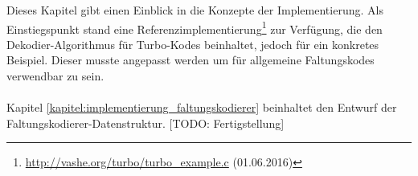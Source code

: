 Dieses Kapitel gibt einen Einblick in die Konzepte der Implementierung. Als Einstiegspunkt stand eine Referenzimplementierung\footnote{\url{http://vashe.org/turbo/turbo_example.c} (01.06.2016)} zur Verfügung, die den Dekodier-Algorithmus für Turbo-Kodes beinhaltet, jedoch für ein konkretes Beispiel. Dieser musste angepasst werden um für allgemeine Faltungskodes verwendbar zu sein.
\\
\\
Kapitel \ref{kapitel:implementierung_faltungskodierer} beinhaltet den Entwurf der Faltungskodierer-Datenstruktur. [TODO: Fertigstellung]
